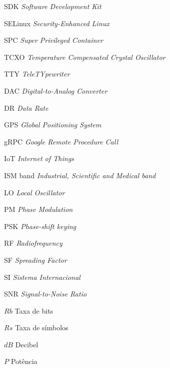 \documentclass[
  12pt,				%
  openright,			%
  twoside,			%
  a4paper,			%
  english,			%
  french,				%
  spanish,			%
  brazil,				%
  ]{abntex2}
\begin{document}
\begin{siglas}
  \item[SDK]        \textit{Software Development Kit}
  \item[SELinux]    \textit{Security-Enhanced Linux}
  \item[SPC]        \textit{Super Privileged Container}
  \item[TCXO]       \textit{Temperature Compensated Crystal Oscillator}
  \item[TTY]        \textit{TeleTYpewriter}
  \item[DAC]        \textit{Digital-to-Analog Converter}
  \item[DR]         \textit{Data Rate}
  \item[GPS]        \textit{Global Positioning System}
  \item[gRPC]       \textit{Google Remote Procedure Call}
  \item[IoT]        \textit{Internet of Things}
  \item[ISM band]   \textit{Industrial, Scientific and Medical band}
  \item[LO]         \textit{Local Oscillator}
  \item[PM]         \textit{Phase Modulation}
  \item[PSK]        \textit{Phase-shift keying}
  \item[RF]         \textit{Radiofrequency}
  \item[SF]         \textit{Spreading Factor}
  \item[SI]         \textit{Sistema Internacional}
  \item[SNR]        \textit{Signal-to-Noise Ratio}

\end{siglas}

\begin{simbolos}
  \item[$ Rb $] Taxa de bits
  \item[$ Rs $] Taxa de símbolos
  \item[$ dB $] Decibel
  \item[$ P $] Potência
\end{simbolos}

\tableofcontents*
\cleardoublepage


\textual
\end{document}
